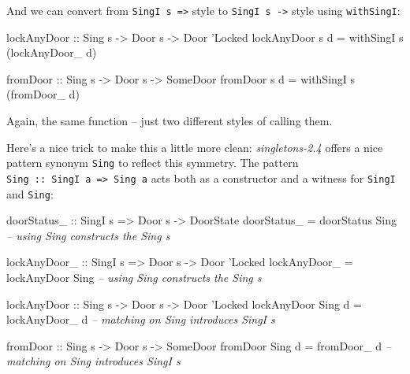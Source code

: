 \documentclass[]{article}
\newenvironment{Shaded}{}{}
\newcommand{\CommentTok}[1]{\textcolor[rgb]{0.38,0.63,0.69}{\textit{#1}}}
\newcommand{\DataTypeTok}[1]{\textcolor[rgb]{0.56,0.13,0.00}{#1}}
\newcommand{\NormalTok}[1]{#1}
\newcommand{\OtherTok}[1]{\textcolor[rgb]{0.00,0.44,0.13}{#1}}
\begin{document}
And we can convert from \texttt{SingI\ s\ =\textgreater{}} style to
\texttt{SingI\ s\ -\textgreater{}} style using \texttt{withSingI}:

\begin{Shaded}
\begin{Highlighting}[]
\OtherTok{lockAnyDoor ::} \DataTypeTok{Sing}\NormalTok{ s }\OtherTok{->} \DataTypeTok{Door}\NormalTok{ s }\OtherTok{->} \DataTypeTok{Door} \DataTypeTok{'Locked}
\NormalTok{lockAnyDoor s d }\OtherTok{=}\NormalTok{ withSingI s (lockAnyDoor_ d)}

\OtherTok{fromDoor ::} \DataTypeTok{Sing}\NormalTok{ s }\OtherTok{->} \DataTypeTok{Door}\NormalTok{ s }\OtherTok{->} \DataTypeTok{SomeDoor}
\NormalTok{fromDoor s d }\OtherTok{=}\NormalTok{ withSingI s (fromDoor_ d)}
\end{Highlighting}
\end{Shaded}

Again, the same function -- just two different styles of calling them.

Here's a nice trick to make this a little more clean: \emph{singletons-2.4}
offers a nice pattern synonym \texttt{Sing} to reflect this symmetry. The
pattern \texttt{Sing\ ::\ SingI\ a\ =\textgreater{}\ Sing\ a} acts both as a
constructor and a witness for \texttt{SingI} and \texttt{Sing}:

\begin{Shaded}
\begin{Highlighting}[]
\OtherTok{doorStatus_ ::} \DataTypeTok{SingI}\NormalTok{ s }\OtherTok{=>} \DataTypeTok{Door}\NormalTok{ s }\OtherTok{->} \DataTypeTok{DoorState}
\NormalTok{doorStatus_ }\OtherTok{=}\NormalTok{ doorStatus }\DataTypeTok{Sing}           \CommentTok{-- using Sing constructs the Sing s}

\OtherTok{lockAnyDoor_ ::} \DataTypeTok{SingI}\NormalTok{ s }\OtherTok{=>} \DataTypeTok{Door}\NormalTok{ s }\OtherTok{->} \DataTypeTok{Door} \DataTypeTok{'Locked}
\NormalTok{lockAnyDoor_ }\OtherTok{=}\NormalTok{ lockAnyDoor }\DataTypeTok{Sing}         \CommentTok{-- using Sing constructs the Sing s}

\OtherTok{lockAnyDoor ::} \DataTypeTok{Sing}\NormalTok{ s }\OtherTok{->} \DataTypeTok{Door}\NormalTok{ s }\OtherTok{->} \DataTypeTok{Door} \DataTypeTok{'Locked}
\NormalTok{lockAnyDoor }\DataTypeTok{Sing}\NormalTok{ d }\OtherTok{=}\NormalTok{ lockAnyDoor_ d     }\CommentTok{-- matching on Sing introduces SingI s}

\OtherTok{fromDoor ::} \DataTypeTok{Sing}\NormalTok{ s }\OtherTok{->} \DataTypeTok{Door}\NormalTok{ s }\OtherTok{->} \DataTypeTok{SomeDoor}
\NormalTok{fromDoor }\DataTypeTok{Sing}\NormalTok{ d }\OtherTok{=}\NormalTok{ fromDoor_ d           }\CommentTok{-- matching on Sing introduces SingI s}
\end{Highlighting}
\end{Shaded}
\end{document}
